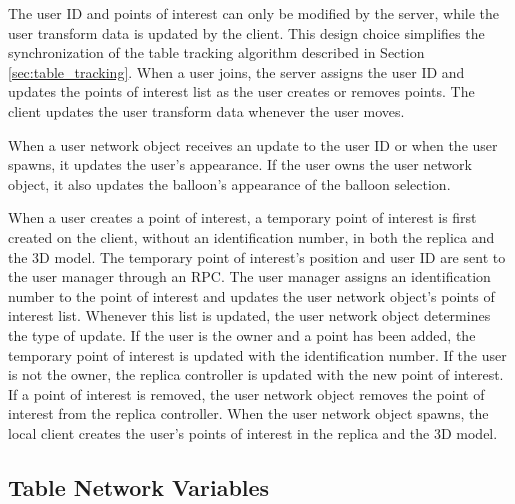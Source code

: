         The user ID and points of interest can only be modified by the server, while the user transform data is updated by the client. This design choice simplifies the synchronization of the table tracking algorithm described in Section \ref{sec:table_tracking}. When a user joins, the server assigns the user ID and updates the points of interest list as the user creates or removes points. The client updates the user transform data whenever the user moves.
        
        When a user network object receives an update to the user ID or when the user spawns, it updates the user's appearance. If the user owns the user network object, it also updates the balloon's appearance of the balloon selection.

        When a user creates a point of interest, a temporary point of interest is first created on the client, without an identification number, in both the replica and the 3D model. The temporary point of interest's position and user ID are sent to the user manager through an RPC. The user manager assigns an identification number to the point of interest and updates the user network object's points of interest list. Whenever this list is updated, the user network object determines the type of update. If the user is the owner and a point has been added, the temporary point of interest is updated with the identification number. If the user is not the owner, the replica controller is updated with the new point of interest. If a point of interest is removed, the user network object removes the point of interest from the replica controller. When the user network object spawns, the local client creates the user's points of interest in the replica and the 3D model.

    \subsection{Table Network Variables} \label{sec:table_network}


